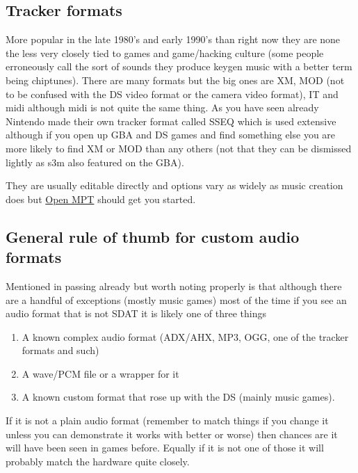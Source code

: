 \documentclass[
]{book}
\providecommand{\tightlist}{%
  \setlength{\itemsep}{0pt}\setlength{\parskip}{0pt}}
\begin{document}
\hypertarget{tracker-formats}{%
\subsection{Tracker formats}\label{tracker-formats}}

More popular in the late 1980's and early 1990's than right now they are none the less very closely tied to games and game/hacking culture (some people erroneously call the sort of sounds they produce keygen music with a better term being chiptunes). There are many formats but the big ones are XM, MOD (not to be confused with the DS video format or the camera video format), IT and midi although midi is not quite the same thing. As you have seen already Nintendo made their own tracker format called SSEQ which is used extensive although if you open up GBA and DS games and find something else you are more likely to find XM or MOD than any others (not that they can be dismissed lightly as s3m also featured on the GBA).

They are usually editable directly and options vary as widely as music creation does but \href{http://openmpt.org/}{Open MPT} should get you started.

\hypertarget{general-rule-of-thumb-for-custom-audio-formats}{%
\subsection{General rule of thumb for custom audio formats}\label{general-rule-of-thumb-for-custom-audio-formats}}

Mentioned in passing already but worth noting properly is that although there are a handful of exceptions (mostly music games) most of the time if you see an audio format that is not SDAT it is likely one of three things

\begin{enumerate}
\def\labelenumi{\arabic{enumi}.}
\tightlist
\item
  A known complex audio format (ADX/AHX, MP3, OGG, one of the tracker formats and such)
\item
  A wave/PCM file or a wrapper for it
\item
  A known custom format that rose up with the DS (mainly music games).
\end{enumerate}

If it is not a plain audio format (remember to match things if you change it unless you can demonstrate it works with better or worse) then chances are it will have been seen in games before. Equally if it is not one of those it will probably match the hardware quite closely.
\end{document}
